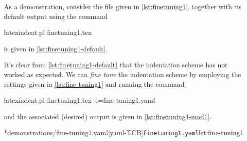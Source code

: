 	\begin{example}
 As a demonstration, consider the file given in \cref{lst:finetuning1}, together with its
 default output using the command
 \begin{commandshell}
latexindent.pl finetuning1.tex 
\end{commandshell}
 is given in \cref{lst:finetuning1-default}.

 \begin{cmhtcbraster}[raster column skip=.01\linewidth]
 \end{cmhtcbraster}

 It's clear from \cref{lst:finetuning1-default} that the indentation scheme has not worked as
 expected. We can \emph{fine tune} the indentation scheme by employing the settings
 given in \cref{lst:fine-tuning1} and running the command
 \begin{commandshell}
latexindent.pl finetuning1.tex -l=fine-tuning1.yaml
\end{commandshell}
 and the associated (desired) output is given in \cref{lst:finetuning1-mod1}.

 \begin{cmhtcbraster}[raster column skip=.01\linewidth]
	 \cmhlistingsfromfile[style=yaml-LST]*{demonstrations/fine-tuning1.yaml}[yaml-TCB]{\texttt{finetuning1.yaml}}{lst:fine-tuning1}
 \end{cmhtcbraster}
	\end{example}

